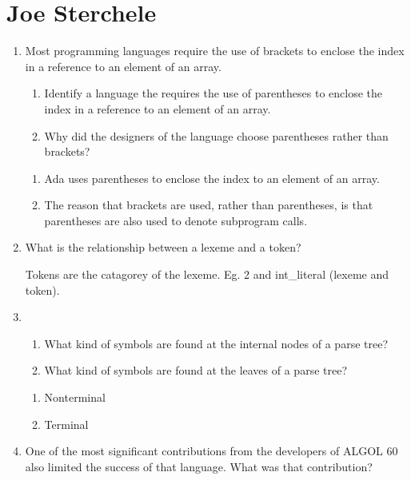 \chapter{Joe Sterchele}

\begin{enumerate}
\item Most programming languages require the use of brackets to
enclose the index in a reference to an element of an array.
\begin{enumerate}
\item Identify a language the requires the use of parentheses
to enclose the index in a reference to an element of an array.
\item Why did the designers of the language choose parentheses
rather than brackets?
\end{enumerate}
\begin{answer}
\begin{enumerate}
\item Ada uses parentheses to enclose the index to an element of an array.
\item The reason that brackets are used, rather than parentheses,
is that parentheses are also used to denote subprogram calls.
\end{enumerate}
\end{answer}
\item What is the relationship between a lexeme and a token?
\begin{answer}
Tokens are the catagorey of the lexeme. Eg. 2 and int\_literal
(lexeme and token).
\end{answer}
\item
\begin{enumerate}
\item What kind of symbols are found at the internal nodes of a
parse tree?
\item What kind of symbols are found at the leaves of a parse tree?
\end{enumerate}
\begin{answer}
\begin{enumerate}
\item Nonterminal
\item Terminal
\end{enumerate}
\end{answer}
\item One of the most significant contributions from the developers
of ALGOL 60 also limited the success of that language. What was
that contribution?
\begin{answer}

\end{answer}
\end{enumerate}
